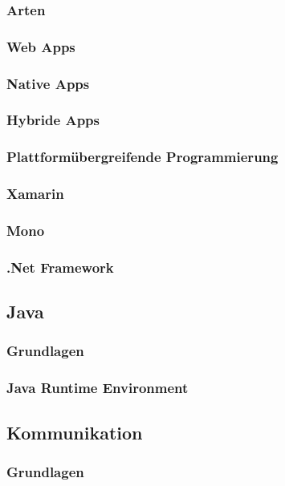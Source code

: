 \subsubsection{Arten}

\subsubsection*{Web Apps}
\subsubsection*{Native Apps}
\subsubsection*{Hybride Apps}

\subsubsection{Plattformübergreifende Programmierung}

\subsubsection*{Xamarin}
\subsubsection{Mono}
\subsubsection{.Net Framework}

\subsection{Java} %

\subsubsection{Grundlagen}
\subsubsection{Java Runtime Environment}

\subsection{Kommunikation} %

\subsubsection{Grundlagen}

